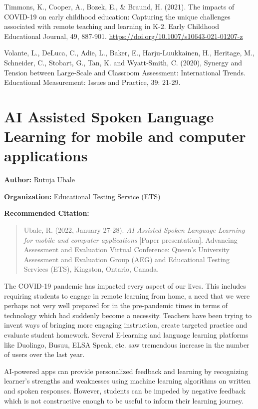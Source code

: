 \documentclass[
]{book}
\begin{document}
Timmons, K., Cooper, A., Bozek, E., \& Braund, H. (2021). The impacts of COVID-19 on early childhood education: Capturing the unique challenges associated with remote teaching and learning in K-2. Early Childhood Educational Journal, 49, 887-901. \url{https://doi.org/10.1007/s10643-021-01207-z}

Volante, L., DeLuca, C., Adie, L., Baker, E., Harju‐Luukkainen, H., Heritage, M., Schneider, C., Stobart, G., Tan, K. and Wyatt‐Smith, C. (2020), Synergy and Tension between Large‐Scale and Classroom Assessment: International Trends. Educational Measurement: Issues and Practice, 39: 21-29.

\newpage

\hypertarget{ai-assisted-spoken-language-learning-for-mobile-and-computer-applications}{%
\section{AI Assisted Spoken Language Learning for mobile and computer applications}\label{ai-assisted-spoken-language-learning-for-mobile-and-computer-applications}}

\textbf{Author:} Rutuja Ubale

\textbf{Organization:} Educational Testing Service (ETS)

\textbf{Recommended Citation:}

\begin{quote}
Ubale, R. (2022, January 27-28). \emph{AI Assisted Spoken Language Learning for mobile and computer applications} {[}Paper presentation{]}. Advancing Assessment and Evaluation Virtual Conference: Queen's University Assessment and Evaluation Group (AEG) and Educational Testing Services (ETS), Kingston, Ontario, Canada.
\end{quote}

The COVID-19 pandemic has impacted every aspect of our lives. This includes requiring students to engage in remote learning from home, a need that we were perhaps not very well prepared for in the pre-pandemic times in terms of technology which had suddenly become a necessity. Teachers have been trying to invent ways of bringing more engaging instruction, create targeted practice and evaluate student homework. Several E-learning and language learning platforms like Duolingo, Busuu, ELSA Speak, etc. saw tremendous increase in the number of users over the last year.

AI-powered apps can provide personalized feedback and learning by recognizing learner's strengths and weaknesses using machine learning algorithms on written and spoken responses. However, students can be impeded by negative feedback which is not constructive enough to be useful to inform their learning journey.
\end{document}
